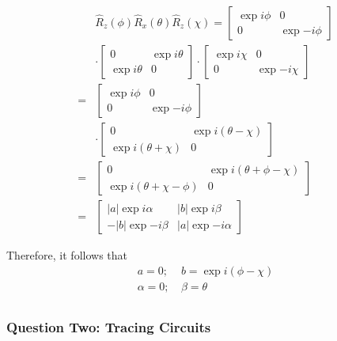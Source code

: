 \documentclass[reprint, amsmath,amssymb, aps]{revtex4-2}
\begin{document}
\begin{mdframed}
                        
                    \begin{align*} &\hat{R}_z(\phi)\hat{R}_x(\theta)\hat{R}_z(\chi) = \begin{bmatrix}\exp{i\phi}&0\\0&\exp{-i\phi}\end{bmatrix} \\
                        &\cdot \begin{bmatrix}0&\exp{i\theta}\\\exp{i\theta}&0\end{bmatrix} \cdot\begin{bmatrix}\exp{i\chi}&0\\0&\exp{-i\chi}\end{bmatrix} \\
                        =& \begin{bmatrix}\exp{i\phi}&0\\0&\exp{-i\phi}\end{bmatrix} \\
                        &\cdot\begin{bmatrix}0&\exp{i(\theta-\chi)}\\\exp{i(\theta+\chi)}&0\end{bmatrix}\\
                         =& \begin{bmatrix}0&\exp{i(\theta+\phi-\chi)}\\\exp{i(\theta+\chi-\phi)}&0\end{bmatrix}\\
                         =& \begin{bmatrix}
                        |a|\exp{i\alpha} & |b|\exp{i\beta} \\
                        -|b|\exp{-i\beta} & |a|\exp{-i\alpha}
                    \end{bmatrix}
                    \end{align*}

                    Therefore, it follows that
                    \begin{align*}
                        a = 0;& \ b=\exp{i(\phi-\chi)} \\
                        \alpha = 0;& \ \beta= \theta \\
                    \end{align*}
                \end{mdframed}
                    
            \subsubsection{Question Two: Tracing Circuits}
\end{document}
